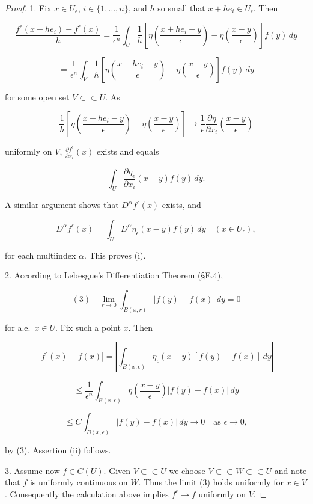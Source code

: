 \begin{proof}
1. Fix $x \in U_\epsilon$, $i \in \{1, \ldots, n\}$, and $h$ so small that $x + h e_i \in U_\epsilon$. Then

$$\frac{f^\epsilon(x + h e_i) - f^\epsilon(x)}{h} = \frac{1}{\epsilon^n} \int_U \frac{1}{h} \left[\eta\left(\frac{x + h e_i - y}{\epsilon}\right) - \eta\left(\frac{x - y}{\epsilon}\right)\right] f(y) \, dy$$

$$= \frac{1}{\epsilon^n} \int_V \frac{1}{h} \left[\eta\left(\frac{x + h e_i - y}{\epsilon}\right) - \eta\left(\frac{x - y}{\epsilon}\right)\right] f(y) \, dy$$

for some open set $V \subset\subset U$. As

$$\frac{1}{h}\left[\eta\left(\frac{x + h e_i - y}{\epsilon}\right) - \eta\left(\frac{x - y}{\epsilon}\right)\right] \to \frac{1}{\epsilon} \frac{\partial \eta}{\partial x_i}\left(\frac{x - y}{\epsilon}\right)$$

uniformly on $V$, $\frac{\partial f^\epsilon}{\partial x_i}(x)$ exists and equals

$$\int_U \frac{\partial \eta_\epsilon}{\partial x_i}(x - y) f(y) \, dy.$$

A similar argument shows that $D^\alpha f^\epsilon(x)$ exists, and

$$D^\alpha f^\epsilon(x) = \int_U D^\alpha \eta_\epsilon(x - y) f(y) \, dy \quad (x \in U_\epsilon),$$

for each multiindex $\alpha$. This proves (i).

2. According to Lebesgue's Differentiation Theorem (\S E.4),

$$(3) \quad \lim_{r \to 0} \int_{B(x,r)} |f(y) - f(x)| \, dy = 0$$

for a.e.\ $x \in U$. Fix such a point $x$. Then

$$|f^\epsilon(x) - f(x)| = \left|\int_{B(x,\epsilon)} \eta_\epsilon(x - y)[f(y) - f(x)] \, dy\right|$$

$$\le \frac{1}{\epsilon^n} \int_{B(x,\epsilon)} \eta\left(\frac{x - y}{\epsilon}\right) |f(y) - f(x)| \, dy$$

$$\le C \int_{B(x,\epsilon)} |f(y) - f(x)| \, dy \to 0 \quad \text{as } \epsilon \to 0,$$

by (3). Assertion (ii) follows.

3. Assume now $f \in C(U)$. Given $V \subset\subset U$ we choose $V \subset\subset W \subset\subset U$ and note that $f$ is uniformly continuous on $W$. Thus the limit (3) holds uniformly for $x \in V$. Consequently the calculation above implies $f^\epsilon \to f$ uniformly on $V$.


\end{proof}
